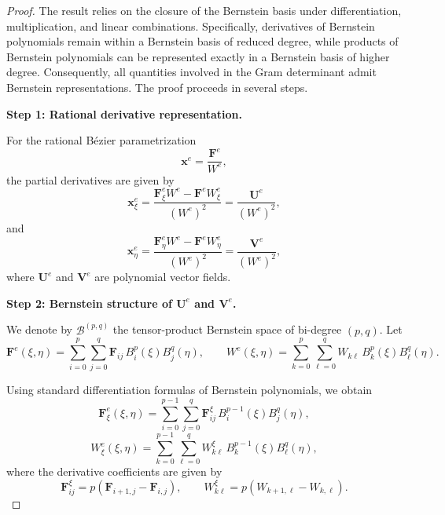 \documentclass{jssc}
\begin{document}
\begin{proof}
The result relies on the closure of the Bernstein basis under differentiation, multiplication, and linear combinations. Specifically, derivatives of Bernstein polynomials remain within a Bernstein basis of reduced degree, while products of Bernstein polynomials can be represented exactly in a Bernstein basis of higher degree. Consequently, all quantities involved in the Gram determinant admit Bernstein representations. The proof proceeds in several steps.

\textbf{Step 1: Rational derivative representation.}

For the rational B\'ezier parametrization
\begin{equation}
    \bm{x}^e = \frac{\mathbf{F}^e}{W^e},
\end{equation}
the partial derivatives are given by
\begin{equation}
\bm{x}^e_\xi = \frac{\mathbf{F}^e_\xi W^e - \mathbf{F}^e W^e_\xi}{(W^e)^2}
= \frac{\mathbf{U}^e}{(W^e)^2},
\end{equation}
and
\begin{equation}
    \bm{x}^e_\eta = \frac{\mathbf{F}^e_\eta W^e - \mathbf{F}^e W^e_\eta}{(W^e)^2} = \frac{\mathbf{V}^e}{(W^e)^2},
\end{equation}
where $\mathbf{U}^e$ and $\mathbf{V}^e$ are polynomial vector fields.

\textbf{Step 2: Bernstein structure of $\mathbf{U}^e$ and $\mathbf{V}^e$.}

We denote by $\mathcal{B}^{(p,q)}$ the tensor-product Bernstein space of bi-degree $(p,q)$. 
Let
\begin{equation}
\mathbf{F}^e(\xi,\eta)
=
\sum_{i=0}^{p}\sum_{j=0}^{q}
\mathbf{F}_{ij} \, B_i^p(\xi) B_j^q(\eta),
\qquad
W^e(\xi,\eta)
=
\sum_{k=0}^{p}\sum_{\ell=0}^{q}
W_{k\ell} \, B_k^p(\xi) B_\ell^q(\eta).
\end{equation}

Using standard differentiation formulas of Bernstein polynomials, we obtain
\begin{equation}
\mathbf{F}^e_\xi(\xi,\eta)
=
\sum_{i=0}^{p-1}\sum_{j=0}^{q}
\mathbf{F}^\xi_{ij} \, B_i^{p-1}(\xi) B_j^q(\eta),
\end{equation}
\begin{equation}
W^e_\xi(\xi,\eta)
=
\sum_{k=0}^{p-1}\sum_{\ell=0}^{q}
W^\xi_{k\ell} \, B_k^{p-1}(\xi) B_\ell^q(\eta),
\end{equation}
where the derivative coefficients are given by
\begin{equation}
\mathbf{F}^\xi_{ij}
=
p \left( \mathbf{F}_{i+1,j} - \mathbf{F}_{i,j} \right),
\qquad
W^\xi_{k\ell}
=
p \left( W_{k+1,\ell} - W_{k,\ell} \right).
\end{equation}


\end{proof}
\end{document}
